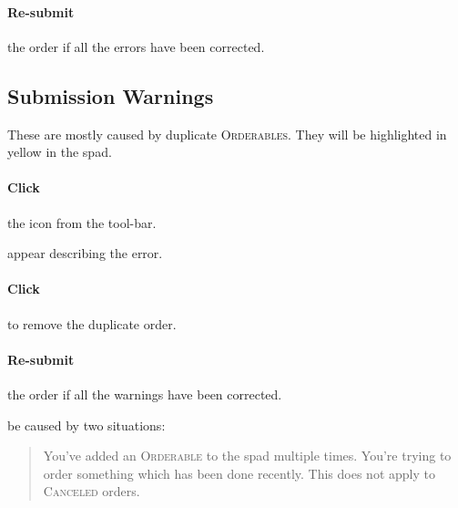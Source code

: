 \paragraph{Re-submit} the order if all the errors have been corrected.

\subsection{Submission Warnings}

These are mostly caused by duplicate \textsc{Orderables}. They will be highlighted in yellow in the \gls{spad}.\\


\paragraph{Click} the  icon from the tool-bar.

 appear describing the error.\\


\paragraph{Click}  to remove the duplicate order.

\paragraph{Re-submit} the order if all the warnings have been corrected.

 be caused by two situations:

\begin{quote}
    \begin{description}
         You've added an \textsc{Orderable} to the \gls{spad} multiple times.
         You're trying to order something which has been done recently. This does not apply to \textsc{Canceled} orders.
    \end{description}
\end{quote}


